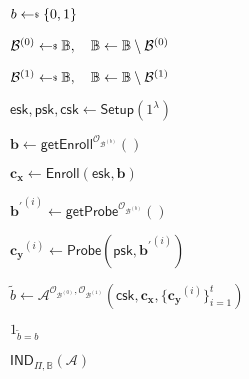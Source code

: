 \begin{figure}[h]
\centering

	\begin{minipage}[t]{0.55\textwidth}
	\begin{algorithm}[H]
	\caption{$\textsf{IND}_{\Pi, \mathbb{B}}(\mathcal{A})$}
	\label{alg:ind_game}
	\begin{algorithmic}[1]
		\State $b \getsdollar \{0, 1\}$

		\State $\mathcal{B}^{(0)} \getsdollar \mathbb{B}, \quad \mathbb{B} \gets \mathbb{B} \setminus \mathcal{B}^{(0)}$

		\State $\mathcal{B}^{(1)} \getsdollar \mathbb{B}, \quad \mathbb{B} \gets \mathbb{B} \setminus \mathcal{B}^{(1)}$

		\State $\textsf{esk}, \textsf{psk}, \textsf{csk} \gets \textsf{Setup}(1^\lambda)$

		\State $\mathbf{b} \gets \textsf{getEnroll}^{\mathcal{O}_{\mathcal{B}^{(b)}}}()$

		\State $\mathbf{c_x} \gets \textsf{Enroll}(\textsf{esk}, \mathbf{b})$


			\State ${\mathbf{b}^\prime}^{(i)} \gets \textsf{getProbe}^{\mathcal{O}_{\mathcal{B}^{(b)}}}() $
		
			\State $\mathbf{c_y}^{(i)} \gets \textsf{Probe}( \textsf{psk}, {\mathbf{b}^\prime}^{(i)} )$

		\EndFor

		

		
			\State $\tilde{b} \gets \mathcal{A}^{\mathcal{O}_{\mathcal{B}^{(0)}}, \mathcal{O}_{\mathcal{B}^{(1)}}} ( \textsf{csk}, \mathbf{c_x}, \{ \mathbf{c_y}^{(i)} \}_{i=1}^t )$

		\State \Return $1_{\tilde{b} = b}$
	\end{algorithmic}
	\end{algorithm}
	\end{minipage}

\label{fig:ind_game}
\end{figure}


